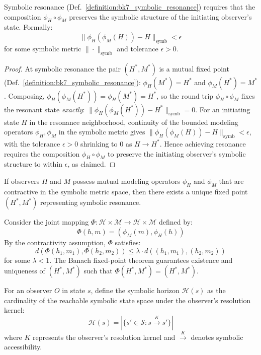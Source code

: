 \begin{lemma}
\label{lemma:bk7_information_preservation}
Symbolic resonance (Def.~\ref{definition:bk7_symbolic_resonance}) requires that the composition $\phi_H \circ \phi_M$ preserves the symbolic structure of the initiating observer's state. Formally:
$$\|\phi_H(\phi_M(H)) - H\|_{\text{symb}} < \epsilon$$
for some symbolic metric $\|\cdot\|_{\text{symb}}$ and tolerance $\epsilon > 0$.
\end{lemma}
\begin{proof}
\label{proof:bk7_information_preservation}
\leavevmode
At symbolic resonance the pair $(H^*,M^*)$ is a mutual fixed point (Def.~\ref{definition:bk7_symbolic_resonance}): $\phi_H(M^*)=H^*$ and $\phi_M(H^*)=M^*$. Composing, $\phi_H(\phi_M(H^*))=\phi_H(M^*)=H^*$, so the round trip $\phi_H\circ\phi_M$ fixes the resonant state \emph{exactly}: $\|\phi_H(\phi_M(H^*))-H^*\|_{\text{symb}}=0$. For an initiating state $H$ in the resonance neighborhood, continuity of the bounded modeling operators $\phi_H,\phi_M$ in the symbolic metric gives $\|\phi_H(\phi_M(H))-H\|_{\text{symb}}<\epsilon$, with the tolerance $\epsilon>0$ shrinking to $0$ as $H\to H^*$. Hence achieving resonance requires the composition $\phi_H\circ\phi_M$ to preserve the initiating observer's symbolic structure to within $\epsilon$, as claimed.
\end{proof}

\begin{theorem}
\label{theorem:bk7_two_way_street_fixed_point}
If observers $H$ and $M$ possess mutual modeling operators $\phi_H$ and $\phi_M$ that are contractive in the symbolic metric space, then there exists a unique fixed point $(H^*, M^*)$ representing symbolic resonance.
\end{theorem}

\begin{demonstratio}
\label{demonstratio:bk7_two_way_street_fixed_point}
Consider the joint mapping $\Phi: \mathcal{H} \times \mathcal{M} \to \mathcal{H} \times \mathcal{M}$ defined by:
$$\Phi(h, m) = (\phi_M(m), \phi_H(h))$$
By the contractivity assumption, $\Phi$ satisfies:
$$d(\Phi(h_1, m_1), \Phi(h_2, m_2)) \leq \lambda \cdot d((h_1, m_1), (h_2, m_2))$$
for some $\lambda < 1$. The Banach fixed-point theorem guarantees existence and uniqueness of $(H^*, M^*)$ such that $\Phi(H^*, M^*) = (H^*, M^*)$.
\end{demonstratio}

\begin{definition}
\label{definition:bk7_symbolic_horizon}
For an observer $O$ in state $s$, define the symbolic horizon $\mathcal{H}(s)$ as the cardinality of the reachable symbolic state space under the observer's resolution kernel:
$$\mathcal{H}(s) = |\{s' \in \mathcal{S} : s \xrightarrow{K} s'\}|$$
where $K$ represents the observer's resolution kernel and $\xrightarrow{K}$ denotes symbolic accessibility.
\end{definition}

